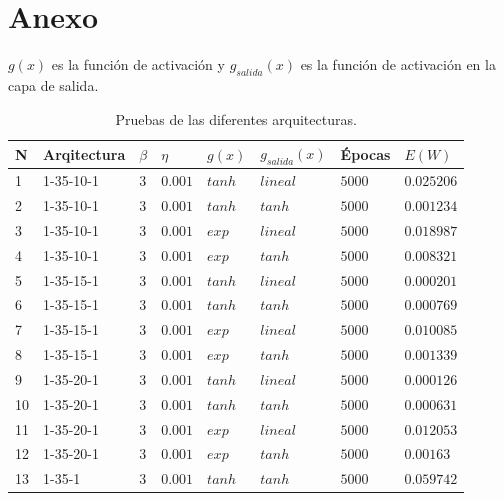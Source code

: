 \documentclass[11pt,a4paper]{article}
\begin{document}
\clearpage	
\appendix
\renewcommand{\figurename}{Figura}
\section{Anexo}

$g(x)$ es la función de activación y $g_{salida}(x)$ es la función de activación en la capa de salida.

{\begin{table}[ht]
\centering
\begin{tabular}{|l|l|l|l|l|l|l|l|}
\hline
N  & Arqitectura & $\beta$ & $\eta$   & $g(x)$ & $g_{salida}(x)$ & Épocas & $E(W)$     \\ \hline
1  & 1-35-10-1    & $3$   & $0.001$ & $tanh$ & $lineal$      & $5000$   & $0.025206$ \\ \hline
2  & 1-35-10-1    & $3$    & $0.001$ & $tanh$ & $tanh$        & $5000$  & $0.001234$ \\ \hline
3  & 1-35-10-1    & $3$   & $0.001$ & $exp$  & $lineal$      & $5000$   & $0.018987$ \\ \hline
4  & 1-35-10-1    & $3$    & $0.001$ & $exp$  & $tanh$        & $5000$   & $0.008321$ \\ \hline
5  & 1-35-15-1    & $3$    & $0.001$ & $tanh$ & $lineal$      & $5000$   & $0.000201$ \\ \hline
6  & 1-35-15-1    & $3$    & $0.001$ & $tanh$ & $tanh$        & $5000$   & $0.000769$ \\ \hline
7  & 1-35-15-1    & $3$   & $0.001$ & $exp$  & $lineal$      & $5000$   & $0.010085$ \\ \hline
8  & 1-35-15-1    & $3$    & $0.001$ & $exp$  & $tanh$        & $5000$   & $0.001339$ \\ \hline
9  & 1-35-20-1    & $3$    & $0.001$ & $tanh$ & $lineal$      & $5000$   & $0.000126$ \\ \hline
10 & 1-35-20-1    & $3$   & $0.001$ & $tanh$ & $tanh$        & $5000$   & $0.000631$ \\ \hline
11 & 1-35-20-1    & $3$    & $0.001$ & $exp$  & $lineal$      & $5000$   & $0.012053$ \\ \hline
12 & 1-35-20-1    & $3$    & $0.001$ & $exp$  & $tanh$        & $5000$   & $0.00163$  \\ \hline
13 & 1-35-1    & $3$    & $0.001$ & $tanh$  & $tanh$        & $5000$   & $0.059742$  \\ \hline
\end{tabular}
\caption{Pruebas de las diferentes arquitecturas.}
\label{table:pruebaArqs} 
\end{table}

}
\end{document}
